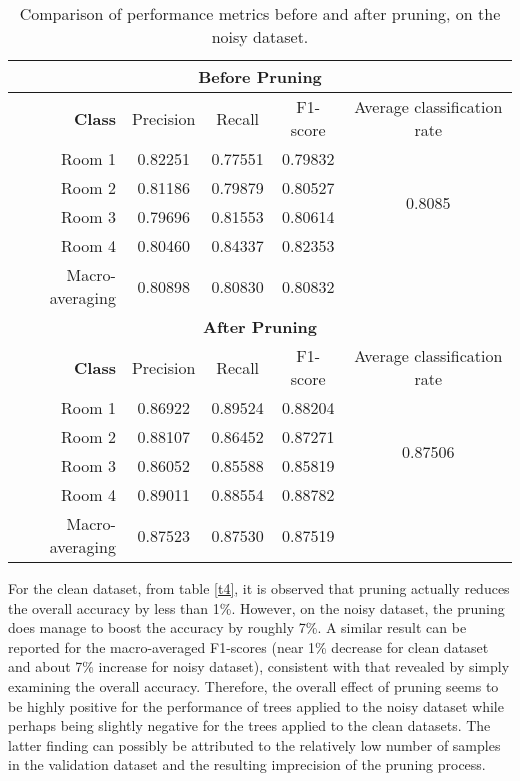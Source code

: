 \documentclass[11pt, a4paper]{article}
\begin{document}
\begin{table}[H]
  \centering
  \setlength{\tabcolsep}{0.25cm}
  \renewcommand{\arraystretch}{1.25}
  \begin{tabular}{|r|c|c|c|c|}
  \hline
  \multicolumn{5}{|c|}{\textbf{Before Pruning}}\\
  \hline
  \textbf{Class} & Precision & Recall & F1-score & Average classification rate \\
  \hline
  Room 1 & 0.82251 & 0.77551 & 0.79832 & \multirow{4}{*}{0.8085}\\ \cline{1-4}
  Room 2 & 0.81186 & 0.79879 & 0.80527 &  \\ \cline{1-4}
  Room 3 & 0.79696 & 0.81553 & 0.80614 &  \\ \cline{1-4}
  Room 4 & 0.80460 & 0.84337 & 0.82353 &   \\ \cline{1-4}
  Macro-averaging & 0.80898 & 0.80830 & 0.80832 &  \\ \hline
  \multicolumn{5}{|c|}{\textbf{After Pruning}}\\
  \hline
  \textbf{Class} & Precision & Recall & F1-score & Average classification rate \\
  \hline
  Room 1 & 0.86922 & 0.89524 & 0.88204 & \multirow{4}{*}{0.87506}\\ \cline{1-4}
  Room 2 & 0.88107 & 0.86452 & 0.87271 &  \\ \cline{1-4}
  Room 3 & 0.86052 & 0.85588 & 0.85819 &  \\ \cline{1-4}
  Room 4 & 0.89011 & 0.88554 & 0.88782 &    \\\cline{1-4}
  Macro-averaging & 0.87523 & 0.87530 & 0.87519 &  \\ \hline
  \end{tabular}
  \caption{Comparison of performance metrics before and after pruning, on the noisy dataset.}
  \label{t5}
\end{table}

\medskip
For the clean dataset, from table \ref{t4}, it is observed that pruning actually reduces the overall accuracy by less than 1\%. However, on the noisy dataset, the pruning does manage to boost the accuracy by roughly 7\%. A similar result can be reported for the macro-averaged F1-scores (near 1\% decrease for clean dataset and about 7\% increase for noisy dataset), consistent with that revealed by simply examining the overall accuracy. Therefore, the overall effect of pruning seems to be highly positive for the performance of trees applied to the noisy dataset while perhaps being slightly negative for the trees applied to the clean datasets. The latter finding can possibly be attributed to the relatively low number of samples in the validation dataset and the resulting imprecision of the pruning process.
\end{document}
